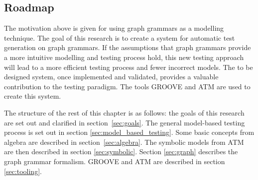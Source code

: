 \subsection{Roadmap}
The motivation above is given for using graph grammars as a modelling technique. The goal of this research is to create a system for automatic test generation on graph grammars. If the assumptions that graph grammars provide a more intuitive modelling and testing process hold, this new testing approach will lead to a more efficient testing process and fewer incorrect models. The to be designed system, once implemented and validated, provides a valuable contribution to the testing paradigm. The tools GROOVE and ATM are used to create this system.

The structure of the rest of this chapter is as follows: the goals of this research are set out and clarified in section~\ref{sec:goals}. The general model-based testing process is set out in section \ref{sec:model_based_testing}. Some basic concepts from algebra are described in section~\ref{sec:algebra}. The symbolic models from ATM are then described in section \ref{sec:symbolic}. Section \ref{sec:graph} describes the graph grammar formalism. GROOVE and ATM are described in section \ref{sec:tooling}.
